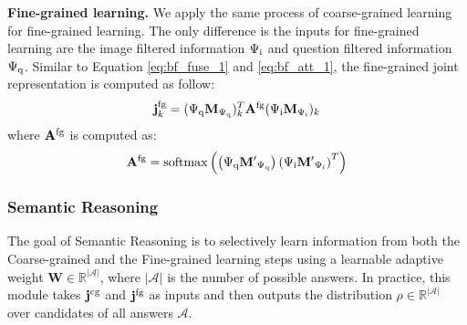 \documentclass[10pt,twocolumn,letterpaper]{article}
\newcommand{\softmax}{\mathrm{softmax}}
\begin{document}
\textbf{Fine-grained learning.} We apply the same process of coarse-grained learning for fine-grained learning. The only difference is the inputs for fine-grained learning are the image filtered information $\Psi_{\rm i}$ and question filtered information $\Psi_{\rm q}$. Similar to Equation \ref{eq:bf_fuse_1} and \ref{eq:bf_att_1}, the fine-grained joint representation is computed as follow:
\begin{equation}
\begin{aligned}
\mathbf{j}_k^{\rm fg} = (\Psi_{\rm q}\mathbf{M}_{\Psi_{\rm q}})^T_k\mathbf{A}^{\rm fg}(\Psi_{\rm i}\mathbf{M}_{\Psi_{\rm i}})_k
\end{aligned}
\label{eq:bf_fuse_2}
\end{equation}
where $\mathbf{A}^{\rm fg}$ is computed as:
\begin{equation}
\begin{aligned}
\mathbf{A}^{\rm fg} = \softmax\left(\left(\Psi_{\rm q}\mathbf{M'}_{\Psi_{\rm q}}\right)\left(\Psi_{\rm i}\mathbf{M'}_{\Psi_{\rm i}}\right)^T\right)
\end{aligned}
\label{eq:bf_att_2}
\end{equation}








\subsubsection{Semantic Reasoning}
\label{subsec:Sec_Adapt}

The goal of Semantic Reasoning is to selectively learn information from both the Coarse-grained and the Fine-grained learning steps using a learnable adaptive weight $\mathbf{W} \in \mathds{R}^{|\mathcal{A}|}$, where $|\mathcal{A}|$ is the number of possible answers. In practice, this module takes $\rm \mathbf{j}^{cg}$ and $\rm \mathbf{j}^{fg}$ as inputs and then outputs the distribution $\rho \in \mathds{R}^{|\mathcal{A}|}$ over candidates of all answers $\mathcal{A}$.
\end{document}
